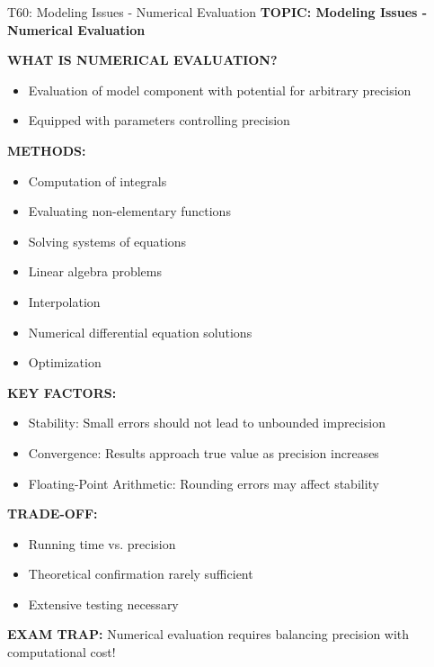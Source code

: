 \documentclass[8pt]{beamer}
\begin{document}
	\begin{frame}{T60: Modeling Issues - Numerical Evaluation}
		\fontsize{6.5}{7.5}\selectfont
		\textbf{TOPIC: Modeling Issues - Numerical Evaluation}
		
		\vspace{0.1cm}
		\textbf{WHAT IS NUMERICAL EVALUATION?}
		\begin{itemize}
			\item Evaluation of model component with potential for arbitrary precision
			\item Equipped with parameters controlling precision
		\end{itemize}
		
		\vspace{0.1cm}
		\textbf{METHODS:}
		\begin{itemize}
			\item Computation of integrals
			\item Evaluating non-elementary functions
			\item Solving systems of equations
			\item Linear algebra problems
			\item Interpolation
			\item Numerical differential equation solutions
			\item Optimization
		\end{itemize}
		
		\vspace{0.1cm}
		\textbf{KEY FACTORS:}
		\begin{itemize}
			\item \textcolor{myblue}{Stability:} Small errors should not lead to unbounded imprecision
			\item \textcolor{myblue}{Convergence:} Results approach true value as precision increases
			\item \textcolor{myblue}{Floating-Point Arithmetic:} Rounding errors may affect stability
		\end{itemize}
		
		\vspace{0.1cm}
		\textbf{TRADE-OFF:}
		\begin{itemize}
			\item Running time vs. precision
			\item Theoretical confirmation rarely sufficient
			\item Extensive testing necessary
		\end{itemize}
		
		\textcolor{myred}{\textbf{EXAM TRAP:}} Numerical evaluation requires \textcolor{myblue}{balancing precision with computational cost}!
	\end{frame}
	
\end{document}
